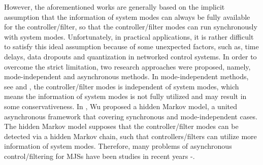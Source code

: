 \documentclass[conference]{IEEEtran}
\begin{document}
	However, the aforementioned works are generally based on the implicit assumption that the information of system modes can always be  fully available for the controller/filter, so that the controller/filter modes can run synchronously with system modes. Unfortunately, in practical applications, it is rather difficult to satisfy this ideal assumption because of some unexpected factors, such as, time delays, data dropouts and quantization in networked control systems. In order to overcome the strict limitation, two research approaches were proposed, namely, mode-independent and asynchronous methods. In mode-independent methods, see \cite{mode_independent_T} and \cite{mode_independent_wuhuaining}, the controller/filter modes is independent of system modes, which means the information of system modes is not fully utilized and may result in some conservativeness. In \cite{passive_wu}, Wu proposed a hidden Markov model, a united asynchronous framework that covering synchronous and mode-independent cases. The hidden Markov model supposes that the controller/filter modes can be detected via a hidden Markov chain, such that controllers/filters can utilize more information of system modes.  Therefore, many problems of asynchronous control/filtering for MJSs have been studies in recent years \cite{Hinfty_shenying}-\cite{continus_filter_dongshanling}.
	
\end{document}
